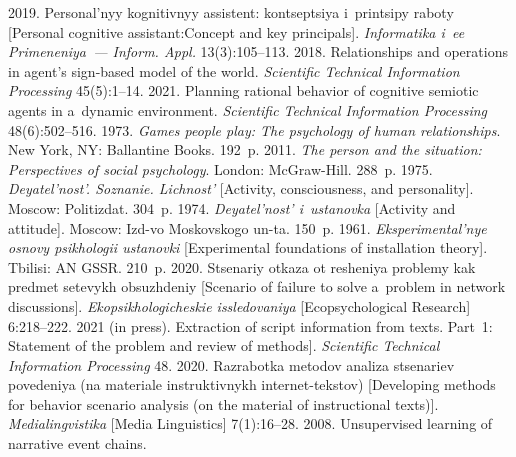 \begin{multicols}{2}
{{\begin{thebibliography}{99}
   2019. Personal'nyy 
kognitivnyy assistent: kon\-tsep\-tsiya i~printsipy raboty [Personal cognitive assistant:\linebreak Concept and 
key principals]. \textit{Informatika i~ee Pri\-me\-ne\-niya~--- Inform. Appl.} 13(3):105--113.
   2018. Relationships and operations in agent's  
sign-based model of the world. \textit{Scientific Technical Information Processing} 45(5):1--14.
   2021. Planning rational behavior of 
cognitive semiotic agents in a~dynamic environment. \textit{Scientific Technical Information 
Processing} 48(6):502--516.
   1973. \textit{Games people play: The psychology of human relationships}. New 
York, NY: Ballantine Books. 192~p.
   2011. \textit{The person and the situation: Perspectives of 
social psychology}. London: McGraw-Hill. 288~p.
   1975. \textit{Deyatel'nost'. Soznanie. Lichnost'} [Activity, 
consciousness, and personality]. Moscow: Po\-lit\-iz\-dat. 304~p.
   1974. \textit{Deyatel'nost' i~ustanovka} [Activity and attitude]. 
Moscow: Izd-vo Moskovskogo un-ta. 150~p.
   1961. \textit{Eksperimental'nye osnovy psikhologii ustanovki} 
[Experimental foundations of installation theory]. Tbilisi: AN GSSR. 210~p.
   2020. Stsenariy otkaza ot resheniya 
problemy kak predmet setevykh obsuzhdeniy [Scenario of failure to solve a~problem in 
network discussions]. \textit{Ekopsikhologicheskie issledovaniya} 
[Ecopsychological Research] 6:218--222.
   2021 (in 
press). Extraction of script information from texts. Part~1: Statement of the problem and review of 
methods]. \textit{Scientific Technical Information Processing} 48.
   2020. Razrabotka metodov analiza stsenariev povedeniya (na materiale 
instruktivnykh internet-tekstov) [Developing methods for behavior scenario analysis (on 
the material of instructional texts)]. \textit{Medialingvistika} [Media Linguistics] 7(1):16--28.
   2008. Unsupervised learning of narrative event chains. 

\end{thebibliography}}}
\end{multicols}
